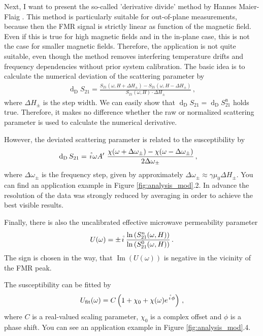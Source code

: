 Next, I want to present the so-called 'derivative divide' method by Hannes Maier-Flaig \cite{maierflaig2018, maierflaig2017}. This method is particularly suitable for out-of-plane measurements, because then the FMR signal is strictly linear as function of the magnetic field. Even if this is true for high magnetic fields and in the in-plane case, this is not the case for smaller magnetic fields. Therefore, the application is not quite suitable, even though the method removes interfering temperature drifts and frequency dependencies without prior system calibration. The basic idea is to calculate the numerical deviation of the scattering parameter by
\begin{align}
    \operatorname{d}_\text{D}S_{21}=\frac{S_{21}(\omega,H+\Delta H_\pm)-S_{21}(\omega,H-\Delta H_\pm)}{S_{21}(\omega,H)\cdot\Delta H_\pm}\,,
\end{align}
where $\Delta H_\pm$ is the step width. We can easily show that $\operatorname{d}_\text{D}S_{21}=\operatorname{d}_\text{D}S_{21}^\text{n}$ holds true. Therefore, it makes no difference whether the raw or normalized scattering parameter is used to calculate the numerical derivative.

However, the deviated scattering parameter is related to the susceptibility by 
\begin{align}
    \operatorname{d}_\text{D}S_{21}&=\ima\omega A'\  \frac{\chi(\omega+\Delta\omega_\pm)-\chi(\omega-\Delta\omega_\pm)}{2\Delta\omega_\pm}\,,
\end{align}
where $\Delta\omega_\pm$ is the frequency step, given by approximately $\Delta\omega_\pm\approx\gamma\mu_0\Delta H_\pm$. You can find an application example in Figure \ref{fig:analysis_mod}.2. In advance the resolution of the data was strongly reduced by averaging in order to achieve the best visible results.

Finally, there is also the uncalibrated effective {microwave permeability} parameter
\begin{align}
    U(\omega)=\pm \ima \, \frac{\operatorname{ln}\left( S_{21}^n(\omega,H)\right)}{\operatorname{ln}\left( S_{21}^0(\omega,H)\right)}\,.
\end{align}
The sign is chosen in the way, that $\operatorname{Im}(U(\omega))$ is negative in the vicinity of the FMR peak. \cite{Kalarickal2006, Barry1986}

The susceptibility can be fitted by
\begin{align}
    U_\text{fit}(\omega)=C\left(1+\chi_0+\chi(\omega) e^{\ima\phi} \right)\,,
\end{align}
where $C$ is a real-valued scaling parameter, $\chi_0$ is a complex offset and $\phi$ is a phase shift. You can see an application example in Figure \ref{fig:analysis_mod}.4. \cite{maierflaig2018, maierflaig2017}

